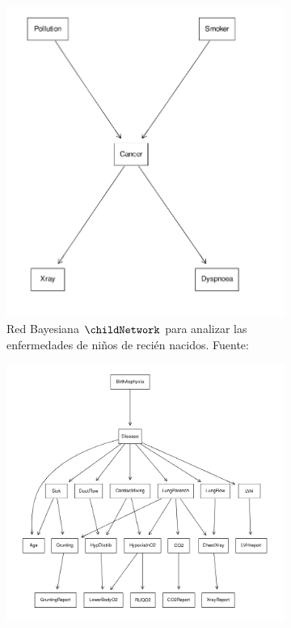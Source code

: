 \begin{figure}[ht]
    \centering

    \begin{subfigure}[b]{0.3\textwidth}
        \centering
        \includegraphics[width=\textwidth]{img/bayesianNetworks/cancerNetwork.png}
        \caption{Red Bayesiana $\childNetwork$ para analizar las enfermedades de niños de recién nacidos. Fuente: \cite{cancerNetwork}}
        \label{fig:cancer_network}
    \end{subfigure}
    \hfill
    \begin{subfigure}[b]{0.6\textwidth}
        \centering
        \includegraphics[width=\textwidth]{img/bayesianNetworks/childNetwork.png}

\end{subfigure}
\end{figure}
